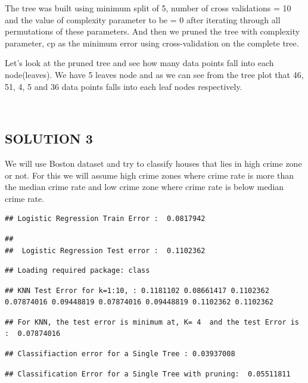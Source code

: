 \documentclass[]{article}
\begin{document}
The tree was built using minimum split of 5, number of cross validations
= 10 and the value of complexity parameter to be = 0 after iterating
through all permutations of these parameters. And then we pruned the
tree with complexity parameter, cp as the minimum error using
cross-validation on the complete tree.

Let's look at the pruned tree and see how many data points fall into
each node(leaves). We have 5 leaves node and as we can see from the tree
plot that 46, 51, 4, 5 and 36 data points falls into each leaf nodes
respectively.

~

\subsection{SOLUTION 3}\label{solution-3}

We will use Boston dataset and try to classify houses that lies in high
crime zone or not. For this we will assume high crime zones where crime
rate is more than the median crime rate and low crime zone where crime
rate is below median crime rate.

\begin{verbatim}
## Logistic Regression Train Error :  0.0817942
\end{verbatim}

\begin{verbatim}
## 
##  Logistic Regression Test error :  0.1102362
\end{verbatim}

\begin{verbatim}
## Loading required package: class
\end{verbatim}

\begin{verbatim}
## KNN Test Error for k=1:10, : 0.1181102 0.08661417 0.1102362 0.07874016 0.09448819 0.07874016 0.09448819 0.1102362 0.1102362
\end{verbatim}

\begin{verbatim}
## For KNN, the test error is minimum at, K= 4  and the test Error is :  0.07874016
\end{verbatim}

\begin{verbatim}
## Classifiaction error for a Single Tree : 0.03937008
\end{verbatim}

\begin{verbatim}
## Classification Error for a Single Tree with pruning:  0.05511811
\end{verbatim}
\end{document}
